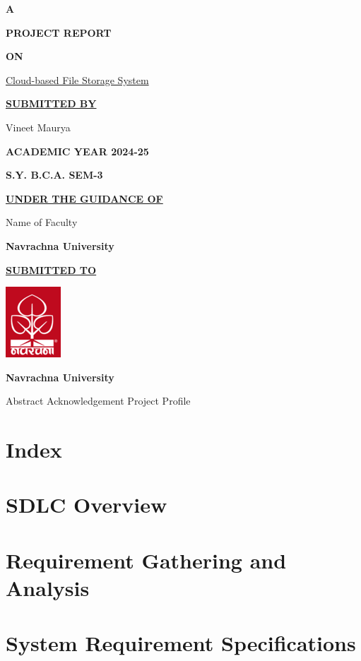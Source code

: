 \documentclass[12pt,a4paper]{report}
\begin{document}
\begin{center}
    \textbf{\LARGE{A}}

    \textbf{\LARGE{PROJECT REPORT}}

    \textbf{\LARGE{ON}}

    \Large{\underline{Cloud-based File Storage System}}
    \vspace{1cm}

    \textbf{\underline{SUBMITTED BY}}

    Vineet Maurya
    \vspace{1cm}

    \textbf{ACADEMIC YEAR 2024-25}

    \textbf{S.Y. B.C.A. SEM-3}
    \vspace{1cm}

    \textbf{\underline{UNDER THE GUIDANCE OF}}

    Name of Faculty

    \textbf{Navrachna University}
    \vspace{1cm}

    \textbf{\underline{SUBMITTED TO}}
    \vspace{0.5cm}

    \includegraphics{nuv_logo.png}
    \vspace{0.5cm}

    \textbf{Navrachna University}
\end{center}
\newpage
{}
\setcounter{page}{1}
Abstract
\newpage
Acknowledgement
\newpage
Project Profile
\newpage
{}
\chapter{Index}
\tableofcontents
\newpage
{}
\setcounter{page}{1}
\chapter{SDLC Overview}
\newpage
\chapter{Requirement Gathering and Analysis}
\newpage
\chapter{System Requirement Specifications}
\newpage
\end{document}
